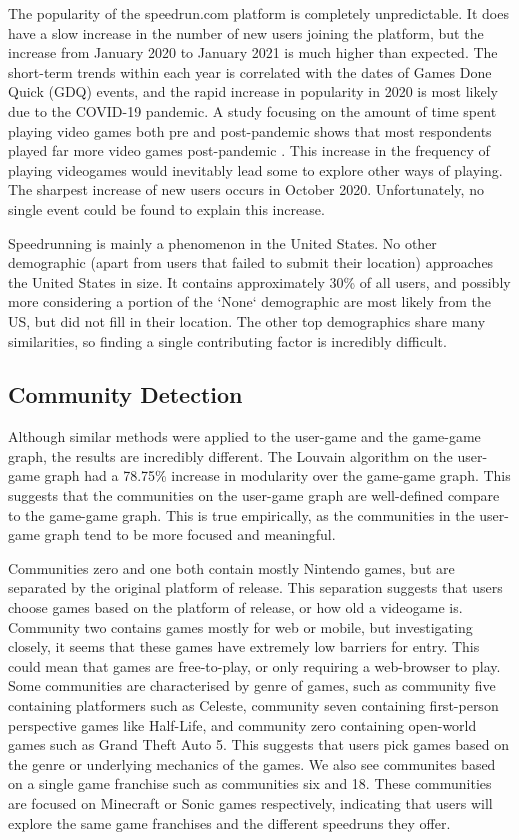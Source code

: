 The popularity of the speedrun.com platform is completely unpredictable. It does have a slow increase in the number of new users joining the platform, but the increase from January 2020 to January 2021 is much higher than expected. The short-term trends within each year is correlated with the dates of Games Done Quick (GDQ) events, and the rapid increase in popularity in 2020 is most likely due to the COVID-19 pandemic. A study focusing on the amount of time spent playing video games both pre and post-pandemic shows that most respondents played far more video games post-pandemic \cite{gamesinpandemic}. This increase in the frequency of playing videogames would inevitably lead some to explore other ways of playing. The sharpest increase of new users occurs in October 2020. Unfortunately, no single event could be found to explain this increase. 


Speedrunning is mainly a phenomenon in the United States. No other demographic (apart from users that failed to submit their location) approaches the United States in size. It contains approximately 30\% of all users, and possibly more considering a portion of the `None` demographic are most likely from the US, but did not fill in their location. The other top demographics share many similarities, so finding a single contributing factor is incredibly difficult.


\subsection{Community Detection}

Although similar methods were applied to the user-game and the game-game graph, the results are incredibly different. The Louvain algorithm on the user-game graph had a 78.75\% increase in modularity over the game-game graph. This suggests that the communities on the user-game graph are well-defined compare to the game-game graph. This is true empirically, as the communities in the user-game graph tend to be more focused and meaningful. 


Communities zero and one both contain mostly Nintendo games, but are separated by the original platform of release. This separation suggests that users choose games based on the platform of release, or how old a videogame is. Community two contains games mostly for web or mobile, but investigating closely, it seems that these games have extremely low barriers for entry. This could mean that games are free-to-play, or only requiring a web-browser to play. Some communities are characterised by genre of games, such as community five containing platformers such as Celeste, community seven containing first-person perspective games like Half-Life, and community zero containing open-world games such as Grand Theft Auto 5. This suggests that users pick games based on the genre or underlying mechanics of the games. We also see communites based on a single game franchise such as communities six and 18. These communities are focused on Minecraft or Sonic games respectively, indicating that users will explore the same game franchises and the different speedruns they offer. 


